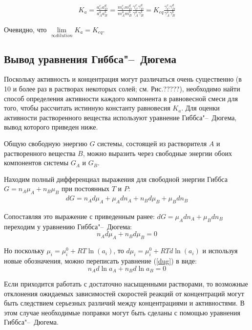 \documentclass[12pt,a4paper,oneside]{book}
\begin{document}
\begin{align}
K_a =  \frac{a_C^c a_D^d}{a_A^a a_B^b} = \frac{m_C^c m_D^d}{m_A^a m_B^b} \frac{\gamma_C^c \gamma_D^d}{\gamma_A^a \gamma_B^b} = K_{eq} \frac{\gamma_C^c \gamma_D^d}{\gamma_A^a \gamma_B^b} 
\end{align}

Очевидно, что $ \lim\limits_{\infty dilution} K_a = K_{eq}$. 


\subsection{Вывод уравнения Гиббса"--~Дюгема}

Поскольку активность и концентрация могут различаться очень существенно (в 10 и более раз в растворах некоторых солей; см. Рис.?????), необходимо найти способ определения активности каждого компонента в равновесной смеси для того, чтобы рассчитать истинную константу равновесия $K_a$. Для оценки активности растворенного вещества используют уравнение Гиббса"--~Дюгема, вывод которого приведен ниже.

Общую свободную энергию $G$ системы, состоящей из растворителя $A$ и растворенного вещества $B$, можно выразить через свободные энергии обоих компонентов системы  $G_A$ и $G_B$.

Находим полный дифференциал выражения для свободной энергии Гиббса $G = n_A \mu_A + n_B \mu_B$ при постоянных $T$ и $P$:
\begin{align}
dG = n_A d\mu_A + \mu_A d n_A + n_B d\mu_B + \mu_B d n_B
\end{align}

Сопоставляя это выражение с приведенным ранее: $dG = \mu_A d n_A + \mu_B d n_B$ переходим у уравнению Гиббса"--~Дюгема: 
\begin{equation}
	\label{dug}
	n_A d\mu_A + n_B d\mu_B = 0
\end{equation}

Но поскольку $\mu_i = \mu_i^0 + RT \ln (a_i)$, то $d \mu_i = \mu_i^0 + RT d \ln (a_i)$ и используя новые обозначения, можно переписать уравнение (\ref{dug}) в виде:
\begin{equation}
	\label{dug2}
	n_A d\ln a_A + n_B d \ln a_B = 0
\end{equation}

Если приходится работать с достаточно насыщенными растворами, то возможные отклонения ожидаемых зависимостей скоростей реакций от концентраций могут быть следствием серьезных различий между концентрациями и активностями. В этом случае необходимые поправки могут быть сделаны с помощью уравнения Гиббса"--~Дюгема. 
\end{document}
